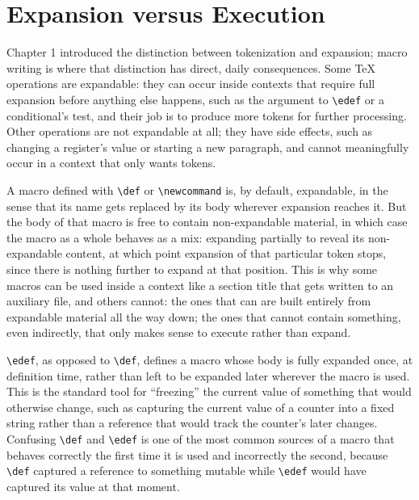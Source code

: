 \hypertarget{expansion-versus-execution}{%
\section{Expansion versus Execution}\label{expansion-versus-execution}}

Chapter 1 introduced the distinction between tokenization and expansion; macro writing is where that distinction has direct, daily consequences. Some TeX operations are expandable: they can occur inside contexts that require full expansion before anything else happens, such as the argument to \texttt{\textbackslash{}edef} or a conditional's test, and their job is to produce more tokens for further processing. Other operations are not expandable at all; they have side effects, such as changing a register's value or starting a new paragraph, and cannot meaningfully occur in a context that only wants tokens.

A macro defined with \texttt{\textbackslash{}def} or \texttt{\textbackslash{}newcommand} is, by default, expandable, in the sense that its name gets replaced by its body wherever expansion reaches it. But the body of that macro is free to contain non-expandable material, in which case the macro as a whole behaves as a mix: expanding partially to reveal its non-expandable content, at which point expansion of that particular token stops, since there is nothing further to expand at that position. This is why some macros can be used inside a context like a section title that gets written to an auxiliary file, and others cannot: the ones that can are built entirely from expandable material all the way down; the ones that cannot contain something, even indirectly, that only makes sense to execute rather than expand.

\texttt{\textbackslash{}edef}, as opposed to \texttt{\textbackslash{}def}, defines a macro whose body is fully expanded once, at definition time, rather than left to be expanded later wherever the macro is used. This is the standard tool for ``freezing'' the current value of something that would otherwise change, such as capturing the current value of a counter into a fixed string rather than a reference that would track the counter's later changes. Confusing \texttt{\textbackslash{}def} and \texttt{\textbackslash{}edef} is one of the most common sources of a macro that behaves correctly the first time it is used and incorrectly the second, because \texttt{\textbackslash{}def} captured a reference to something mutable while \texttt{\textbackslash{}edef} would have captured its value at that moment.

